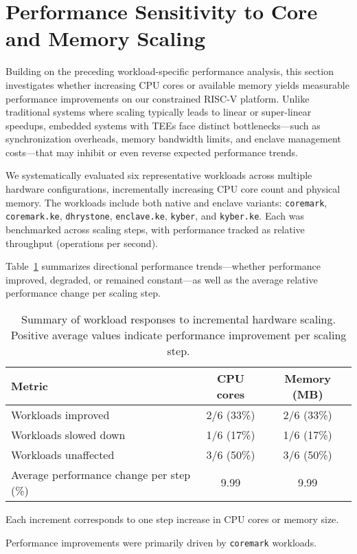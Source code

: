 \section{Performance Sensitivity to Core and Memory Scaling}
\label{sec:hardware-impact}

Building on the preceding workload-specific performance analysis, this section investigates whether increasing CPU cores or available memory yields measurable performance improvements on our constrained RISC-V platform. Unlike traditional systems where scaling typically leads to linear or super-linear speedups, embedded systems with TEEs face distinct bottlenecks—such as synchronization overheads, memory bandwidth limits, and enclave management costs—that may inhibit or even reverse expected performance trends.

We systematically evaluated six representative workloads across multiple hardware configurations, incrementally increasing CPU core count and physical memory. The workloads include both native and enclave variants: \texttt{coremark}, \texttt{coremark.ke}, \texttt{dhrystone}, \texttt{enclave.ke}, \texttt{kyber}, and \texttt{kyber.ke}. Each was benchmarked across scaling steps, with performance tracked as relative throughput (operations per second).

Table~\ref{tab:hardware-impact} summarizes directional performance trends—whether performance improved, degraded, or remained constant—as well as the average relative performance change per scaling step.

\begin{table}[htbp]
\centering
\begin{threeparttable}
\caption{Summary of workload responses to incremental hardware scaling. Positive average values indicate performance improvement per scaling step.}
\label{tab:hardware-impact}
\begin{tabular}{@{}lcc@{}}
\toprule
\textbf{Metric} & \textbf{CPU cores} & \textbf{Memory (MB)} \\
\midrule
Workloads improved                      & 2/6 (33\%) & 2/6 (33\%) \\
Workloads slowed down                   & 1/6 (17\%) & 1/6 (17\%) \\
Workloads unaffected                    & 3/6 (50\%) & 3/6 (50\%) \\
Average performance change per step (\%)& 9.99   & 9.99   \\
\bottomrule
\end{tabular}
\begin{tablenotes}
\footnotesize
\item Each increment corresponds to one step increase in CPU cores or memory size.
\item Performance improvements were primarily driven by \texttt{coremark} workloads.
\end{tablenotes}
\end{threeparttable}
\end{table}

